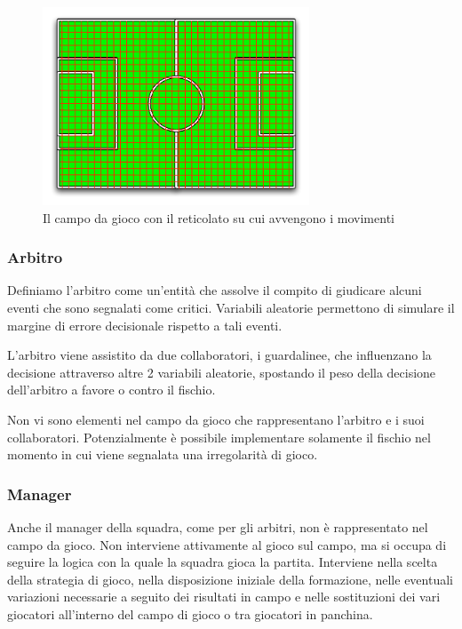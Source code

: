 \documentclass[aps,letterpaper,10pt]{article}
\begin{document}
\begin{figure}[H]
	\begin{center}
		\includegraphics[width=300px]{images/field-web.pdf}
	\end{center}
\caption{Il campo da gioco con il reticolato su cui avvengono i movimenti}
\end{figure}

\subsubsection{Arbitro}

Definiamo l'arbitro come un'entit\`a che assolve il compito di giudicare alcuni eventi che sono segnalati come critici.
Variabili aleatorie permettono di simulare il margine di errore decisionale rispetto a tali eventi. \vspace{3mm}

L'arbitro viene assistito da due collaboratori, i guardalinee, che influenzano la decisione attraverso altre 2 variabili
aleatorie, spostando il peso della decisione dell'arbitro a favore o contro il fischio. \vspace{3mm}

Non vi sono elementi nel campo da gioco che rappresentano l'arbitro e i suoi collaboratori. Potenzialmente \`e possibile
implementare solamente il fischio nel momento in cui viene segnalata una irregolarit\`a di gioco.

\subsubsection{Manager}
\label{man}

Anche il manager della squadra, come per gli arbitri, non \`e rappresentato nel campo da gioco. Non interviene
attivamente al gioco sul campo, ma si occupa di seguire la logica con la quale la squadra gioca la partita. Interviene
nella scelta della strategia di gioco, nella disposizione iniziale della formazione, nelle eventuali variazioni
necessarie a seguito dei risultati in campo e nelle sostituzioni dei vari giocatori all'interno del campo di gioco o tra
giocatori in panchina. \vspace{3mm}
\end{document}
